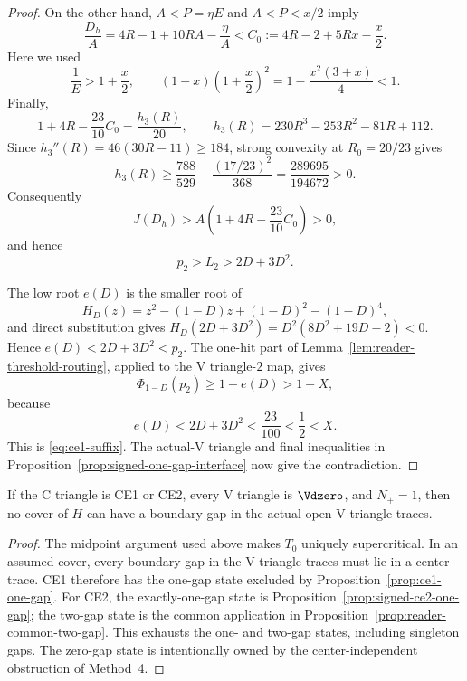 \begin{proof}
On the other hand, $A<P=\eta E$ and $A<P<x/2$ imply
\[
 \frac{D_h}{A}
 =4R-1+10RA-\frac{\eta}{A}
 <C_0:=4R-2+5Rx-\frac x2.
\]
Here we used
\[
 \frac1E>1+\frac x2,
 \qquad
 (1-x)\left(1+\frac x2\right)^2
 =1-\frac{x^2(3+x)}4<1.
\]
Finally,
\[
 1+4R-\frac{23}{10}C_0=\frac{h_3(R)}{20},
 \qquad
 h_3(R)=230R^3-253R^2-81R+112.
\]
Since $h_3''(R)=46(30R-11)\ge184$, strong convexity at $R_0=20/23$
gives
\[
 h_3(R)\ge
 \frac{788}{529}-\frac{(17/23)^2}{368}
 =\frac{289695}{194672}>0.
\]
Consequently
\[
 J(D_h)>A\left(1+4R-\frac{23}{10}C_0\right)>0,
\]
and hence
\[
 p_2>L_2>2D+3D^2.
\]

The low root $e(D)$ is the smaller root of
\[
 H_D(z)=z^2-(1-D)z+(1-D)^2-(1-D)^4,
\]
and direct substitution gives
$H_D(2D+3D^2)=D^2(8D^2+19D-2)<0$.  Hence
$e(D)<2D+3D^2<p_2$.  The one-hit part of
Lemma~\ref{lem:reader-threshold-routing}, applied to the V triangle-$2$ map, gives
\[
 \Phi_{1-D}(p_2)\ge1-e(D)>1-X,
\]
because
\[
 e(D)<2D+3D^2<\frac{23}{100}<\frac12<X.
\]
This is \eqref{eq:ce1-suffix}.  The actual-V triangle and final inequalities in
Proposition~\ref{prop:signed-one-gap-interface} now give the contradiction.
\end{proof}

\begin{proposition}[nonempty gap all-$\Vdzero$, $N_+=1$]
\label{prop:nplus-one-all-vd0}
If the C triangle is CE1 or CE2, every V triangle is $\Vdzero$, and
$N_+=1$, then no cover of $H$ can have a boundary gap in the actual open
V triangle traces.
\end{proposition}

\begin{proof}
The midpoint argument used above makes $T_0$ uniquely supercritical.  In an
assumed cover, every boundary gap in the V triangle traces must lie in a
center trace.  CE1 therefore has the one-gap state excluded by
Proposition~\ref{prop:ce1-one-gap}.  For CE2, the exactly-one-gap state is
Proposition~\ref{prop:signed-ce2-one-gap}; the two-gap state is the common
application in Proposition~\ref{prop:reader-common-two-gap}.  This
exhausts the one- and two-gap states, including singleton gaps.  The zero-gap
state is intentionally owned by the center-independent obstruction of
Method~4.
\end{proof}
